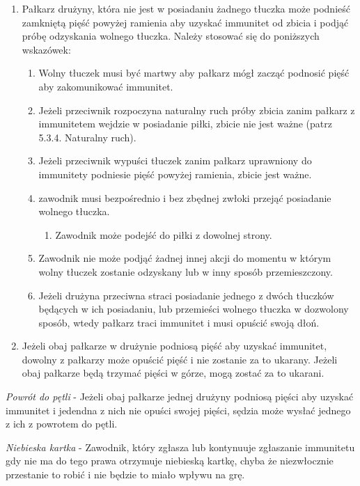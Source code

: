 \documentclass[12pt]{article}
\begin{document}
\begin{enumerate}
\item
    Pałkarz drużyny, która nie jest w posiadaniu żadnego tłuczka może
  podnieść zamkniętą pięść powyżej ramienia aby uzyskać immunitet od
  zbicia i podjąć próbę odzyskania wolnego tłuczka. Należy stosować się
  do poniższych wskazówek:
  
  \begin{enumerate}
  \item
        Wolny tłuczek musi być martwy aby pałkarz mógł zacząć podnosić pięść
    aby zakomunikować immunitet.
      \item
        Jeżeli przeciwnik rozpoczyna naturalny ruch próby zbicia zanim
    pałkarz z immunitetem wejdzie w posiadanie piłki, zbicie nie jest
    ważne (patrz 5.3.4. Naturalny ruch).
      \item
        Jeżeli przeciwnik wypuści tłuczek zanim pałkarz uprawniony do
    immunitety podniesie pięść powyżej ramienia, zbicie jest ważne.
      \item
        zawodnik musi bezpośrednio i bez zbędnej zwłoki przejąć posiadanie
    wolnego tłuczka.
    
    \begin{enumerate}
    \item
            Zawodnik może podejść do piłki z dowolnej strony.
          \end{enumerate}
  \item
        Zawodnik nie może podjąć żadnej innej akcji do momentu w którym
    wolny tłuczek zostanie odzyskany lub w inny sposób przemieszczony.
      \item
        Jeżeli drużyna przeciwna straci posiadanie jednego z dwóch tłuczków
    będących w ich posiadaniu, lub przemieści wolnego tłuczka w
    dozwolony sposób, wtedy pałkarz traci immunitet i musi opuścić swoją
    dłoń.
      \end{enumerate}
\item
    Jeżeli obaj pałkarze w drużynie podniosą pięść aby uzyskać immunitet,
  dowolny z pałkarzy może opuścić pięść i nie zostanie za to ukarany.
  Jeżeli obaj pałkarze będą trzymać pięści w górze, mogą zostać za to
  ukarani.
  \end{enumerate}

\emph{Powrót do pętli} - Jeżeli obaj pałkarze jednej drużyny podniosą
pięści aby uzyskać immunitet i jedendna z nich nie opuści swojej pięści,
sędzia może wysłać jednego z ich z powrotem do pętli.

\emph{Niebieska kartka} - Zawodnik, który zgłasza lub kontynuuje
zgłaszanie immunitetu gdy nie ma do tego prawa otrzymuje niebieską
kartkę, chyba że niezwłocznie przestanie to robić i nie będzie to miało
wpływu na grę.
\end{document}
